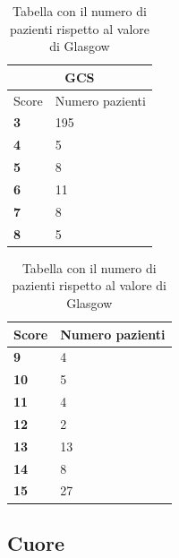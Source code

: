 \begin{table}[h!]
	\parbox{.45\textwidth}{
		\centering
		\begin{tabular}{ |p{3cm}|p{3cm} | }
			\hline
			\multicolumn{2}{|c|}{GCS} \\
			\hline \hline
			Score  & Numero pazienti  \\
			\hline \hline
			\textbf{3} & 195 \\
			\hline
			\textbf{4} & 5 \\
			\hline
			\textbf{5} & 8 \\
			\hline
			\textbf{6} & 11 \\
			\hline
			\textbf{7} & 8 \\
			\hline
			\textbf{8} & 5 \\
			\hline
		\end{tabular}}
	\quad
	\parbox{.45\textwidth}{
		\centering
		\begin{tabular}{ |p{3cm}|p{3cm} | }
			\hline 
			Score  & Numero pazienti  \\
			\hline \hline
			\textbf{9} & 4 \\
			\hline
			\textbf{10} & 5 \\
			\hline
			\textbf{11} & 4 \\
			\hline
			\textbf{12} & 2 \\
			\hline
			\textbf{13} & 13 \\
			\hline
			\textbf{14} & 8 \\
			\hline
			\textbf{15} & 27 \\
			\hline
		\end{tabular}}
	\caption{Tabella con il numero di pazienti rispetto al valore di Glasgow}
	\label{tab:gcs}
\end{table}

\subsection{Cuore}

